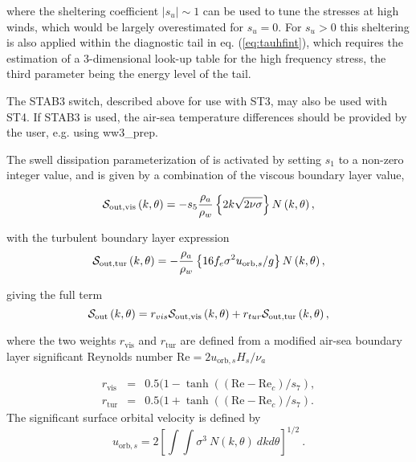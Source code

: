 \noindent 
where the sheltering coefficient $\left|s_u\right|\sim 1$ can be used to tune
the stresses at high winds, which would be largely overestimated for
$s_u=0$. For $s_u > 0$ this sheltering is also applied within the diagnostic
tail in eq. (\ref{eq:tauhfint}), which requires the estimation of a
3-dimensional look-up table for the high frequency stress, the third parameter
being the energy level of the tail.

The {\code STAB3} switch, described above for use with {\code ST3}, may also be used with {\code ST4}. If {\code STAB3} is used, the air-sea  temperature differences should be provided by the user, e.g. using {\file ww3\_prep}.

The swell dissipation parameterization of \cite{art:ACC09} is activated by
setting $s_1$ to a non-zero integer value, and is given by a combination of
the viscous boundary layer value,

\begin{equation}
{\cal S}_{\mathrm{out,vis}}\left(k,\theta\right) = - s_5 \frac{\rho_a}{\rho_w}\left\{ 2 k \sqrt{2
\nu \sigma}\right\}  N \left(k,\theta\right) , \label{eq:Dore}
\end{equation}

\noindent
with the turbulent boundary layer expression 
\begin{equation}
{\cal S}_{\mathrm{out,tur}} \left(k,\theta\right) = - \frac{\rho_a}{\rho_w}\left\{  16 f_e
\sigma^2 u_{\mathrm{orb},s} / g \right\}
 N\left(k,\theta\right),  \label{eq:swell_turb}
\end{equation}

\noindent
giving the full term 
\begin{equation}
{\cal S}_{\mathrm{out}} \left(k,\theta\right) = r_{vis} {\cal S}_{\mathrm{out,vis}}\left(k,\theta\right)  + 
 r_{tur} {\cal S}_{\mathrm{out,tur}}\left(k,\theta\right),  
 \label{eq:swell_comb}
\end{equation}

\noindent
where the two weights $ r_{\mathrm{vis}} $ and $r_{\mathrm{tur}}$ are defined from 
a modified  air-sea boundary layer significant Reynolds number $\mathrm{Re} = 2
u_{\mathrm{orb},s} H_s / \nu_{a}$ 

\begin{eqnarray}
 r_{\mathrm{vis}} &=& 0.5 (1- \tanh((\mathrm{Re}-\mathrm{Re}_{c})/s_7), \\
 r_{\mathrm{tur}}&=& 0.5 (1+ \tanh((\mathrm{Re}-\mathrm{Re}_{c})/s_7) .
\end{eqnarray}
The significant surface orbital velocity is defined by
\begin{equation} u_{\mathrm{orb},s} = 2 \left [  \int \!\!\!\! \int
      \sigma^3 \: N(k,\theta) \: dk d\theta \right ] ^{1/2}
      \: . \label{eq:ub_orbs} \end{equation}

